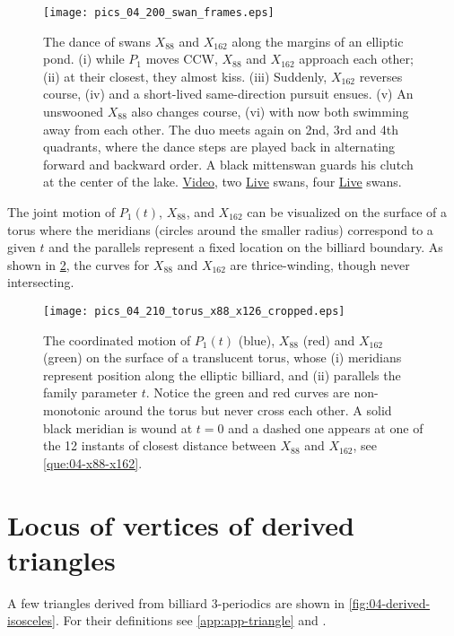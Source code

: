 \begin{figure}
    \centering
    \texttt{[image: pics\_04\_200\_swan\_frames.eps]}
    \caption{The dance of swans $X_{88}$ and $X_{162}$ along the margins of an elliptic pond. (i) while $P_1$ moves CCW, $X_{88}$ and $X_{162}$ approach each other; (ii) at their closest, they almost kiss. (iii) Suddenly, $X_{162}$ reverses course, (iv) and a short-lived same-direction pursuit ensues. (v) An unswooned $X_{88}$ also changes course, (vi) with now both swimming away from each other. The duo meets again on 2nd, 3rd and 4th quadrants, where the dance steps are played back in alternating forward and backward order. A black mittenswan guards his clutch at the center of the lake. \href{https://youtu.be/ljGTtA1x-Sk}{Video}, two \href{https://bit.ly/3f6M9Wh}{Live} swans, four \href{https://bit.ly/3oDhMdd}{Live} swans.}
    \label{fig:x88-x162}
\end{figure}

The joint motion of $P_1(t)$, $X_{88}$, and $X_{162}$ can be visualized on the surface of a torus where the meridians (circles around the smaller radius) correspond to a given $t$ and the parallels represent a fixed location on the billiard boundary. As shown in \cref{fig:04-3d-torus}, the curves for $X_{88}$ and $X_{162}$ are thrice-winding, though never intersecting.

\begin{figure}
    \centering
    \texttt{[image: pics\_04\_210\_torus\_x88\_x126\_cropped.eps]}
    \caption{The coordinated motion of $P_1(t)$ (blue), $X_{88}$ (red) and $X_{162}$ (green) on the surface of a translucent torus, whose (i) meridians represent position along the elliptic billiard, and (ii) parallels the family parameter $t$. Notice the green and red curves are non-monotonic around the torus but never cross each other. A solid black meridian is wound at $t=0$ and a dashed one appears at one of the 12 instants of closest distance between $X_{88}$ and $X_{162}$, see \cref{que:04-x88-x162}.}
    \label{fig:04-3d-torus}
\end{figure}

\section{Locus of vertices of derived triangles}

A few triangles derived from billiard 3-periodics are shown in \cref{fig:04-derived-isosceles}. For their definitions see \cref{app:app-triangle} and \cite{mw}.

